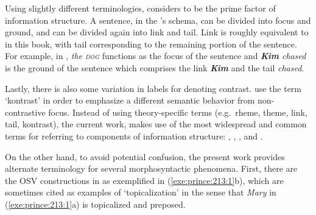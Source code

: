 Using slightly different terminologies, \citet{vallduvi:90} considers
 to be the prime factor of information structure.  A sentence, in
the \citeauthor{vallduvi:90}'s schema, can be divided into focus and
ground, and  can be divided again into link and tail. Link is
roughly equivalent to  in this book, with tail corresponding to
the remaining portion of the sentence. For example, in
, \textit{the \textsc{dog}} functions as the
focus of the sentence and \textit{\textbf{Kim} chased} is the ground
of the sentence which comprises the link \textit{\textbf{Kim}} and the
tail \textit{chased}.




\noindent Lastly, there is also some variation in labels for denoting
contrast.  \citet{vallduvi:vilkuna:98} use the term `kontrast' in
order to emphasize a different semantic behavior from non-contrastive
focus.  Instead of using theory-specific terms (e.g.\ rheme, theme,
link, tail, kontrast), the current work, makes use of the most
widespread and common terms for referring to components of information
structure: , , , and
.


On the other hand, to avoid potential confusion, the present work
provides alternate terminology for several morphosyntactic phenomena.
First, there are the OSV constructions in  as exemplified in
(\ref{exe:prince:213:1}b), which are sometimes cited as examples of
`topicalization' in the sense that \textit{Mary} in
(\ref{exe:prince:213:1}a) is topicalized and preposed.


